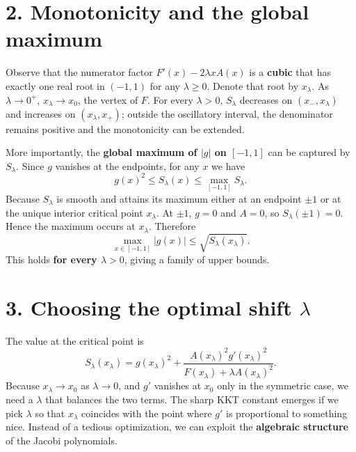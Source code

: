 \documentclass[11pt]{article}
\begin{document}
\section*{2. Monotonicity and the global maximum}

Observe that the numerator factor \(F'(x)-2\lambda x A(x)\) is a \textbf{cubic} that has exactly one real root in \((-1,1)\) for any \(\lambda\ge0\). Denote that root by \(x_\lambda\). As \(\lambda\to0^+\), \(x_\lambda\to x_0\), the vertex of \(F\). For every \(\lambda>0\), \(S_\lambda\) decreases on \((x_-,x_\lambda)\) and increases on \((x_\lambda,x_+)\); outside the oscillatory interval, the denominator remains positive and the monotonicity can be extended.

More importantly, the \textbf{global maximum of \(|g|\) on \([-1,1]\)} can be captured by \(S_\lambda\). Since \(g\) vanishes at the endpoints, for any \(x\) we have
\begin{equation*}
g(x)^2 \le S_\lambda(x) \le \max_{[-1,1]} S_\lambda .
\end{equation*}
Because \(S_\lambda\) is smooth and attains its maximum either at an endpoint \(\pm1\) or at the unique interior critical point \(x_\lambda\). At \(\pm1\), \(g=0\) and \(A=0\), so \(S_\lambda(\pm1)=0\). Hence the maximum occurs at \(x_\lambda\). Therefore
\begin{equation*}
\max_{x\in[-1,1]}|g(x)| \le \sqrt{ S_\lambda(x_\lambda) } .
\tag{5}
\end{equation*}
This holds \textbf{for every \(\lambda>0\)}, giving a family of upper bounds.

\section*{3. Choosing the optimal shift \(\lambda\)}

The value at the critical point is
\begin{equation*}
S_\lambda(x_\lambda) =
g(x_\lambda)^2
+ \frac{A(x_\lambda)^2 g'(x_\lambda)^2}
{F(x_\lambda)+\lambda A(x_\lambda)^2} .
\end{equation*}
Because \(x_\lambda\to x_0\) as \(\lambda\to0\), and \(g'\) vanishes at \(x_0\) only in the symmetric case, we need a \(\lambda\) that balances the two terms. The sharp KKT constant emerges if we pick \(\lambda\) so that \(x_\lambda\) coincides with the point where \(g'\) is proportional to something nice. Instead of a tedious optimization, we can exploit the \textbf{algebraic structure} of the Jacobi polynomials.
\end{document}
